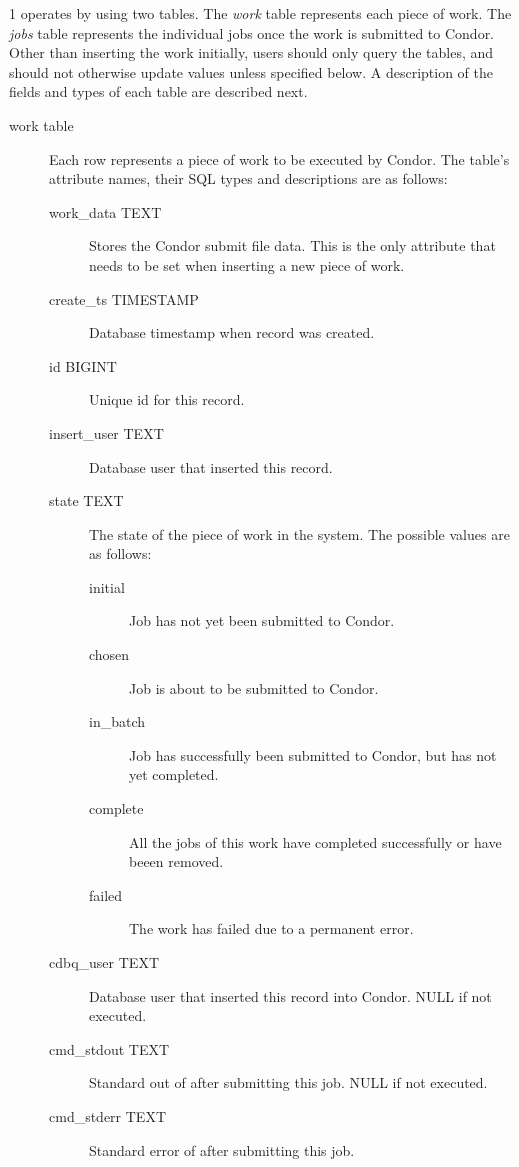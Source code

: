 \begin{ManPage}{\label{man-condor-dbq.pl}}{1}
 operates by using two tables.
The \emph{work} table represents each piece of work.
The \emph{jobs} table represents the individual jobs once the work is submitted
to Condor.
Other than inserting the work initially, users should only query the tables,
and should not otherwise update values unless specified below.  A description
of the fields and types of each table are described next.

\begin{description}
\item[work table]
  Each row represents a piece of work to be executed by Condor.
  The table's attribute names, their SQL types and descriptions are as follows:

  \begin{description}
    \item[work\_data TEXT]
	Stores the Condor submit file data.
	This is the only attribute that needs to be set when inserting a
	new piece of work.
    \item[create\_ts TIMESTAMP]
	Database timestamp when record was created.
    \item[id BIGINT]
	Unique id for this record.
    \item[insert\_user TEXT]
	Database user that inserted this record.
    \item[state TEXT]
      The state of the piece of work in the system.
      The possible values are as follows:
      \begin{description}
	\item[initial]
	  Job has not yet been submitted to Condor.
	\item[chosen]
	  Job is about to be submitted to Condor.
	\item[in\_batch]
	  Job has successfully been submitted to Condor, but has not
	  yet completed.
	\item[complete]
	  All the jobs of this work have completed successfully or
	  have beeen removed.
	\item[failed]
	  The work has failed due to a permanent error.
      \end{description}
    \item[cdbq\_user TEXT]
	Database user that inserted this record into Condor.
	NULL if  not executed.
    \item[cmd\_stdout TEXT]
	Standard out of  after submitting this job.
	NULL if  not executed.
    \item[cmd\_stderr TEXT]
	Standard error of  after submitting this job.

\end{description}
\end{description}
\end{ManPage}
